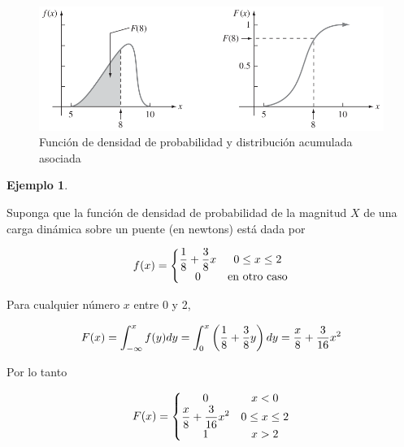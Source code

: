 \documentclass[
  11pt,
]{book}
\theoremstyle{definition}
\theoremstyle{definition}
\newtheorem{example}{Ejemplo}[chapter]
\theoremstyle{definition}
\theoremstyle{definition}
\theoremstyle{remark}
\begin{document}
\begin{figure}

{\centering \includegraphics[width=0.7\linewidth]{material/img/acumulada} 

}

\caption{Función de densidad de probabilidad y distribución acumulada asociada}\label{fig:acumulada}
\end{figure}

\begin{example}
\protect\hypertarget{exm:densidad1}{}\label{exm:densidad1}

Suponga que la función de densidad de probabilidad de la magnitud \(X\) de una carga dinámica sobre un puente (en newtons) está dada por

\begin{equation}
  \notag
  f(x) = \left\lbrace
  \begin{matrix}
    \displaystyle\frac{1}{8} + \displaystyle\frac{3}{8}x & 0\leq x \leq 2 \\
    0 & \text{en otro caso}
  \end{matrix} \right.
\end{equation}

Para cualquier número \(x\) entre 0 y 2,

\begin{equation}
  \notag
  F(x) = \int_{-\infty}^xf(y)dy = \int_{0}^x \left(\frac{1}{8} + \frac{3}{8}y\right) dy = \frac{x}{8} + \frac{3}{16}x^2
\end{equation}

Por lo tanto

\begin{equation}
  \notag
  F(x) = \left\lbrace
  \begin{matrix}
    0 & x<0 \\
    \displaystyle\frac{x}{8} + \displaystyle\frac{3}{16}x^2 & 0\leq x \leq 2 \\
    1 & x > 2\\
  \end{matrix} \right.
\end{equation}

\end{example}
\end{document}
